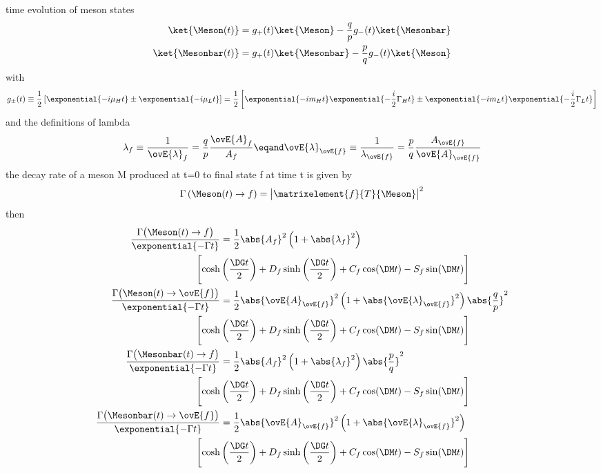 time evolution of meson states
%
\begin{equation}
  \begin{split}
    \ket{\Meson (t)}    &= g_{+}(t) \ket{\Meson}    - \frac{q}{p} g_{-}(t) \ket{\Mesonbar} \\
    \ket{\Mesonbar (t)} &= g_{+}(t) \ket{\Mesonbar} - \frac{p}{q} g_{-}(t) \ket{\Meson}
  \end{split}
\end{equation}
%
with 
%
\begin{equation}
  g_{\pm}(t) \equiv 
  \frac{1}{2} \left[
    \exponential{-i \mu_H t} \pm \exponential{-i \mu_L t}
  \right]
  =
  \frac{1}{2} \left[
    \exponential{-i m_H t} \exponential{-\frac{i}{2} \Gamma_H t} \pm \exponential{-i m_L t} \exponential{-\frac{i}{2} \Gamma_L t}
  \right]
\end{equation}
%
and the definitions of lambda
%
\begin{equation}
  \lambda_f               \equiv \frac{1}{\ovE{\lambda}_f}   = \frac{q}{p} \frac{\ovE{A}_f}{A_f} \eqand 
  \ovE{\lambda}_{\ovE{f}} \equiv \frac{1}{\lambda_{\ovE{f}}} = \frac{p}{q} \frac{A_{\ovE{f}}}{\ovE{A}_{\ovE{f}}}
\end{equation}
%
the decay rate of a meson M produced at t=0 to final state f at time t is given by
%
\begin{equation}
  \Gamma \left(\Meson(t)\to f\right)= \bigl\vert \matrixelement{f}{T}{\Meson} \bigr\vert^2
\end{equation}
%
then
%
\begin{equation}
  \begin{split}
    \frac{\Gamma \bigl(\Meson   (t) \to       f \bigr)}{\exponential{-\Gamma t}} &= 
      \frac{1}{2} \abs{A_f}^2 \left( 1 + \abs{\lambda_f}^2 \right) \\
        \Biggl[ \cosh&\left(\frac{\DG t}{2}\right) + D_f \sinh\left(\frac{\DG t}{2}\right) + C_f \cos(\DM t) - S_f \sin(\DM t) \Biggr] \\
    \frac{\Gamma \bigl(\Meson   (t) \to \ovE{f} \bigr)}{\exponential{-\Gamma t}} &= 
      \frac{1}{2} \abs{\ovE{A}_{\ovE{f}}}^2 \left( 1 + \abs{\ovE{\lambda}_{\ovE{f}}}^2 \right) \abs{\frac{q}{p}}^2 \\
        \Biggl[ \cosh&\left(\frac{\DG t}{2}\right) + D_f \sinh\left(\frac{\DG t}{2}\right) + C_f \cos(\DM t) - S_f \sin(\DM t) \Biggr] \\
    \frac{\Gamma \bigl(\Mesonbar(t) \to       f \bigr)}{\exponential{-\Gamma t}} &= 
      \frac{1}{2} \abs{A_f}^2 \left( 1 + \abs{\lambda_f}^2 \right) \abs{\frac{p}{q}}^2 \\
        \Biggl[ \cosh&\left(\frac{\DG t}{2}\right) + D_f \sinh\left(\frac{\DG t}{2}\right) + C_f \cos(\DM t) - S_f \sin(\DM t) \Biggr] \\
    \frac{\Gamma \bigl(\Mesonbar(t) \to \ovE{f} \bigr)}{\exponential{-\Gamma t}} &= 
      \frac{1}{2} \abs{\ovE{A}_{\ovE{f}}}^2 \left( 1 + \abs{\ovE{\lambda}_{\ovE{f}}}^2 \right) \\
        \Biggl[ \cosh&\left(\frac{\DG t}{2}\right) + D_f \sinh\left(\frac{\DG t}{2}\right) + C_f \cos(\DM t) - S_f \sin(\DM t) \Biggr] \\
  \end{split}
\end{equation}
